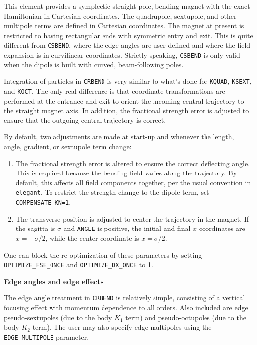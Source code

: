This element provides a symplectic straight-pole, bending magnet with the exact
Hamiltonian in Cartesian coordinates.  
The quadrupole, sextupole, and other multipole terms are defined in Cartesian coordinates.
The magnet at present is restricted to having rectangular ends with symmetric entry and
exit.
This is quite different from \verb|CSBEND|, where the edge angles are user-defined and
where the field expansion is in curvilinear coordinates.
Strictly speaking, \verb|CSBEND| is only valid when the dipole is built with curved,
beam-following poles.

Integration of particles in \verb|CRBEND| is very similar to what's done for
\verb|KQUAD|, \verb|KSEXT|, and \verb|KOCT|. 
The only real difference is that coordinate transformations are performed at the
entrance and exit to orient the incoming central trajectory to the straight magnet axis.
In addition, the fractional strength error is adjusted to ensure that the 
outgoing central trajectory is correct.

By default, two adjustments are made at start-up and whenever the length, angle, 
gradient, or sextupole term change:
\begin{enumerate}
\item The fractional strength error is altered to ensure the correct deflecting angle. 
      This is required because the bending field varies along the trajectory.
      By default, this affects all field 
      components together, per the usual convention in {\tt elegant}. To restrict
      the strength change to the dipole term, set \verb|COMPENSATE_KN=1|.
\item The transverse position is adjusted to center the trajectory in the magnet.
      If the sagitta is $\sigma$ and \verb|ANGLE| is positive, the initial and final $x$ 
      coordinates are $x=-\sigma/2$, while the center coordinate is $x=\sigma/2$.
\end{enumerate}
One can block the re-optimization of these parameters by setting 
\verb|OPTIMIZE_FSE_ONCE| and \verb|OPTIMIZE_DX_ONCE| to 1.

{\bf Edge angles and edge effects} 

The edge angle treatment in \verb|CRBEND| is relatively simple, consisting of a 
vertical focusing effect with momentum dependence to all orders.
Also included are edge pseudo-sextupoles (due to the body $K_1$ term) and
pseudo-octupoles (due to the body $K_2$ term).
The user may also specify edge multipoles using the \verb|EDGE_MULTIPOLE| parameter.

